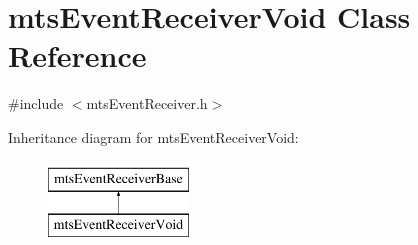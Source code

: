 \hypertarget{classmts_event_receiver_void}{}\section{mts\+Event\+Receiver\+Void Class Reference}
\label{classmts_event_receiver_void}


{\ttfamily \#include $<$mts\+Event\+Receiver.\+h$>$}

Inheritance diagram for mts\+Event\+Receiver\+Void\+:\begin{figure}[H]
\begin{center}
\leavevmode
\includegraphics[height=2.000000cm]{d5/d12/classmts_event_receiver_void}
\end{center}
\end{figure}
